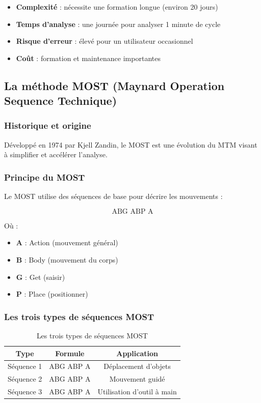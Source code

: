 \documentclass[a4paper,12pt]{article}
\begin{document}
\begin{itemize}
    \item \textbf{Complexité} : nécessite une formation longue (environ 20 jours)
    \item \textbf{Temps d'analyse} : une journée pour analyser 1 minute de cycle
    \item \textbf{Risque d'erreur} : élevé pour un utilisateur occasionnel
    \item \textbf{Coût} : formation et maintenance importantes
\end{itemize}

\subsection{La méthode MOST (Maynard Operation Sequence Technique)}

\subsubsection{Historique et origine}

Développé en 1974 par Kjell Zandin, le MOST est une évolution du MTM visant à simplifier et accélérer l'analyse.

\subsubsection{Principe du MOST}

Le MOST utilise des séquences de base pour décrire les mouvements :

\[
\text{ABG ABP A}
\]

Où :
\begin{itemize}
    \item \textbf{A} : Action (mouvement général)
    \item \textbf{B} : Body (mouvement du corps)
    \item \textbf{G} : Get (saisir)
    \item \textbf{P} : Place (positionner)
\end{itemize}

\subsubsection{Les trois types de séquences MOST}

\begin{table}[ht]
\centering
\begin{tabular}{|c|c|c|}
\hline
\textbf{Type} & \textbf{Formule} & \textbf{Application} \\
\hline
Séquence 1 & ABG ABP A & Déplacement d'objets \\
Séquence 2 & ABG ABP A & Mouvement guidé \\
Séquence 3 & ABG ABP A & Utilisation d'outil à main \\
\hline
\end{tabular}
\caption{Les trois types de séquences MOST}
\end{table}
\end{document}
